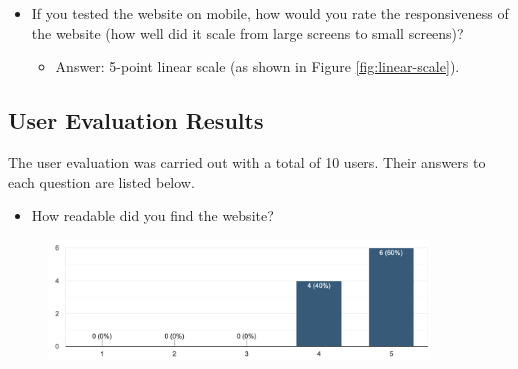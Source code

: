 \documentclass[letterpaper,12pt]{article}
\begin{document}
\begin{appendices}
\begin{itemize}
    \item If you tested the website on mobile, how would you rate the responsiveness of the website (how well did it scale from large screens to small screens)?
    \begin{itemize}
        \item Answer: 5-point linear scale (as shown in Figure \ref{fig:linear-scale}).
    \end{itemize}
\end{itemize}

\subsection{User Evaluation Results}

The user evaluation was carried out with a total of 10 users. Their answers to each question are listed below.

\begin{itemize}
    \item How readable did you find the website?
\end{itemize}

\begin{figure}[h] 
\centerline{\includegraphics[width=0.9\textwidth]{report/images/user-survey-site-readability.png}}
{\label{fig:user-survey-site-readability}}
\end{figure}


\end{appendices}
\end{document}
